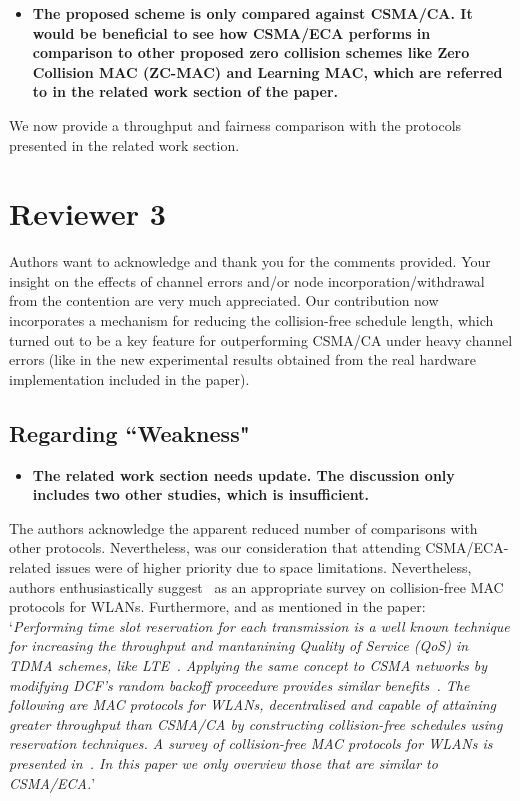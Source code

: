 \documentclass[]{article}
\begin{document}
	\begin{itemize}
		\item {\bfseries The proposed scheme is only compared against CSMA/CA. It would be beneficial to see how CSMA/ECA performs in comparison to other proposed zero collision schemes like Zero Collision MAC (ZC-MAC) and Learning MAC, which are referred to in the related work section of the paper.}
	\end{itemize}
		
		We now provide a throughput and fairness comparison with the protocols presented in the related work section.
		
		
		
		
\section{Reviewer 3}
Authors want to acknowledge and thank you for the comments provided. Your insight on the effects of channel errors and/or node incorporation/withdrawal from the contention are very much appreciated. Our contribution now incorporates a mechanism for reducing the collision-free schedule length, which turned out to be a key feature for outperforming CSMA/CA under heavy channel errors (like in the new experimental results obtained from the real hardware implementation included in the paper).

	\subsection{Regarding ``Weakness"}
		\begin{itemize}
			\item {\bfseries The related work section needs update. The discussion only includes two other studies, which is insufficient.}
		\end{itemize}
		
		The authors acknowledge the apparent reduced number of comparisons with other protocols. Nevertheless, was our consideration that attending CSMA/ECA-related issues were of higher priority due to space limitations. Nevertheless, authors enthusiastically suggest~\cite{L_MAC} as an appropriate survey on collision-free MAC protocols for WLANs. Furthermore, and as mentioned in the paper:\\
		
		`\emph{Performing time slot reservation for each transmission is a well known technique for increasing the throughput and mantanining Quality of Service (QoS) in TDMA schemes, like LTE~\cite{canoLTEcoexistence}. Applying the same concept to CSMA networks by modifying DCF's random backoff proceedure provides similar benefits~\cite{HE}. The following are MAC protocols for WLANs, decentralised and capable of attaining greater throughput than CSMA/CA by constructing collision-free schedules using reservation techniques. A survey of collision-free MAC protocols for WLANs is presented in~\cite{L_MAC}. In this paper we only overview those that are similar to CSMA/ECA.}'\\
		
\end{document}

